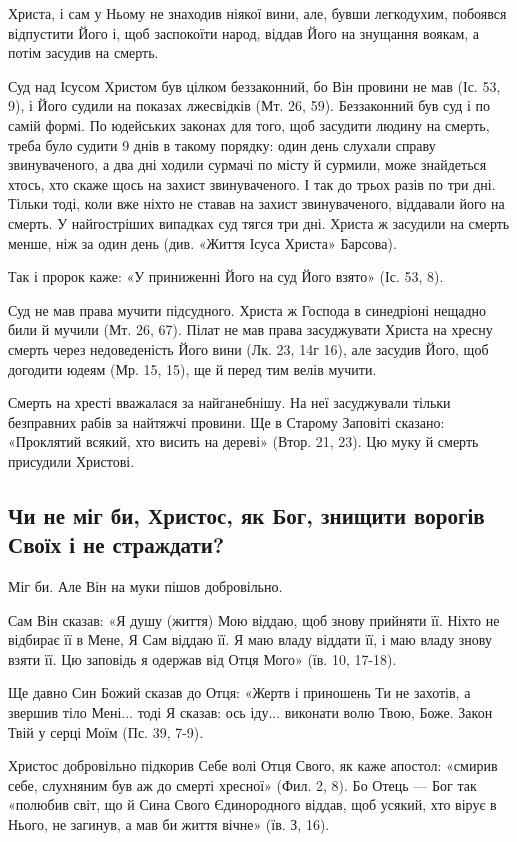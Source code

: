 \documentclass[main.tex]{subfiles}
\begin{document}
Христа, і сам у Ньому не знаходив ніякої вини, але, бувши легкодухим, побоявся відпустити Його і, щоб заспокоїти народ, віддав Його на знущання воякам, а потім засудив на смерть.

Суд над Ісусом Христом був цілком беззаконний, бо Він провини не мав (Іс. 53, 9), і Його судили на показах лжесвідків (Мт. 26, 59). Беззаконний був суд і по самій формі. По юдейських законах для того, щоб засудити людину на смерть, треба було судити 9 днів в такому порядку: один день слухали справу звинуваченого, а два дні ходили сурмачі по місту й сурмили, може знайдеться хтось, хто скаже щось на захист звинуваченого. І так до трьох разів по три дні. Тільки тоді, коли вже ніхто не ставав на захист звинуваченого, віддавали його на смерть. У найгостріших випадках суд тягся три дні. Христа ж засудили на смерть менше, ніж за один день (див. «Життя Ісуса Христа» Барсова).

Так і пророк каже: «У приниженні Його на суд Його взято» (Іс. 53, 8).

Суд не мав права мучити підсудного. Христа ж Господа в синедріоні нещадно били й мучили (Мт. 26, 67). Пілат не мав права засуджувати Христа на хресну смерть через недоведеність Його вини (Лк. 23, 14г 16), але засудив Його, щоб догодити юдеям (Мр. 15, 15), ще й перед тим велів мучити.

Смерть на хресті вважалася за найганебнішу. На неї засуджували тільки безправних рабів за найтяжчі провини. Ще в Старому Заповіті сказано: «Проклятий всякий, хто висить на дереві» (Втор. 21, 23). Цю муку й смерть присудили Христові.

\subsection{Чи не міг би, Христос, як Бог, знищити ворогів Своїх і не страждати?}

Міг би. Але Він на муки пішов добровільно.

Сам Він сказав: «Я душу (життя) Мою віддаю, щоб знову прийняти її. Ніхто не відбирає її в Мене, Я Сам віддаю її. Я маю владу віддати її, і маю владу знову взяти її. Цю заповідь я одержав від Отця Мого» (їв. 10, 17-18).

Ще давно Син Божий сказав до Отця: «Жертв і приношень Ти не захотів, а звершив тіло Мені... тоді Я сказав: ось іду... виконати волю Твою, Боже. Закон Твій у серці Моїм (Пс. 39, 7-9).
 
Христос добровільно підкорив Себе волі Отця Свого, як каже апостол: «смирив себе, слухняним був аж до смерті хресної» (Фил. 2, 8). Бо Отець — Бог так «полюбив світ, що й Сина Свого Єдинородного віддав, щоб усякий, хто вірує в Нього, не загинув, а мав би життя вічне» (їв. З, 16).
\end{document}
